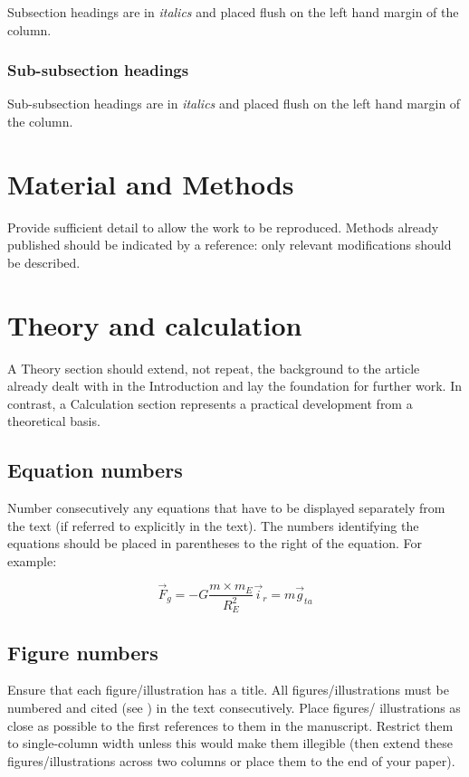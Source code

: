 \documentclass{IACpaper}
\begin{document}
      Subsection headings are in \textit{italics} and placed flush on the left hand margin of the column.

      \subsubsection{Sub-subsection headings}

      Sub-subsection headings are in \textit{italics} and placed flush on the left hand margin of the column.

  \section{Material and Methods}

    Provide sufficient detail to allow the work to be reproduced. Methods already published should be indicated by a reference: only relevant modifications should be described.

  \section{Theory and calculation}

    A Theory section should extend, not repeat, the background to the article already dealt with in the Introduction and lay the foundation for further work. In contrast, a Calculation section represents a practical development from a theoretical basis.

    \subsection{Equation numbers}

      Number consecutively any equations that have to be displayed separately from the text (if referred to explicitly in the text). The numbers identifying the equations should be placed in parentheses to the right of the equation. For example:

      \begin{equation}
        \overrightarrow{F}_g = - G\frac{m\times m_E}{R_E^2} \overrightarrow{i}_r = m\overrightarrow{g}_{ta}
      \end{equation}

    \subsection{Figure numbers}

      Ensure that each figure/illustration has a title. All figures/illustrations must be numbered and cited (see ) in the text consecutively. Place figures/ illustrations as close as possible to the first references to them in the manuscript. Restrict them to single-column width unless this would make them illegible (then extend these figures/illustrations across two columns or place them to the end of your paper).
\end{document}
